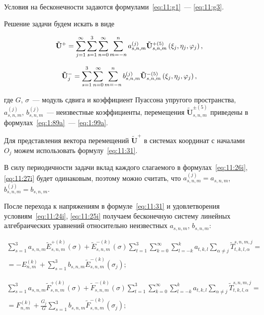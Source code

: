 \noindent Условия на бесконечности задаются формулами~\eqref{eq:11:g1}~--- \eqref{eq:11:g3}.

Решение задачи будем искать в виде

\begin{equation}
{\bf{\tilde U^+}} = \sum\limits_{j = 1}^\infty {\sum\limits_{s = 1}^3 {\sum\limits_{n = 0}^\infty  {\sum\limits_{m=-n}^{n} {a_{s,n,m}^{(j)}} } } } {\bf{\tilde U}}_{s,n,m}^{ + (5)}\left( {{\xi_j},{\eta _j},{\varphi _j}} \right),
\label{eq:11:26i}
\end{equation}

\begin{equation}
\mathbf{\tilde U}_j^- = {\sum\limits_{s = 1}^3 {\sum\limits_{n = 0}^\infty  {\sum\limits_{m=-n}^{n} {b_{s,n,m}^{(j)}} } } } {\bf{\tilde U}}_{s,n,m}^{ - (5)}\left( {{\xi_j},{\eta _j},{\varphi _j}} \right),
\label{eq:11:27i}
\end{equation}

\noindent где $G$, $\sigma$~--- модуль сдвига и коэффициент Пуассона упругого пространства, $a_{s,n,m}^{(j)}$, $b_{s,n,m}^{(j)}$~--- неизвестные коэффициенты, перемещения $\mathbf{\tilde U}_{s,n,m}^{\pm(5)}$ приведены в формулах~\eqref{eq:1:89a}~--- \eqref{eq:1:99a}.

Для представления вектора перемещений $\mathbf{\tilde U}^+$ в системах координат с началами $O_j$ можем использовать формулу~\eqref{eq:11:31}.

В силу периодичности задачи вклад каждого слагаемого в формулах~\eqref{eq:11:26i}, \eqref{eq:11:27i} будет одинаковым, поэтому можно считать, что $a_{s,n,m}^{(j)}=a_{s,n,m}$, $b_{s,n,m}^{(j)}=b_{s,n,m}$.

После перехода к напряжениям в формуле~\eqref{eq:11:31} и удовлетворения условиям~\eqref{eq:11:24i}, \eqref{eq:11:25i} получаем бесконечную систему линейных алгебраических уравнений относительно неизвестных $a_{s,n,m}$, $b_{s,n,m}$:

\begin{multline}
\sum\limits_{s=1}^3 a_{s,n,m}\tilde E_{s,n,m}^{+(k)}(\sigma)+\tilde E_{s,n,m}^{-(k)}(\sigma)\sum\limits_{t=1}^3\sum\limits_{k=0}^\infty\sum\limits_{l=-k}^k a_{t,k,l}\sum\limits_{\alpha\neq j}\tilde T_{t,k,l,\alpha}^{s,n,m,j}= \\
=-E_{n,m}^{(k)}+\sum\limits_{s=1}^3 b_{s,n,m}\tilde E_{s,n,m}^{-(k)}(\sigma_j);
\label{eq:11:28i}
\end{multline}

\begin{multline}
\sum\limits_{s=1}^3 a_{s,n,m}\tilde F_{s,n,m}^{+(k)}(\sigma)+\tilde F_{s,n,m}^{-(k)}(\sigma)\sum\limits_{t=1}^3\sum\limits_{k=0}^\infty\sum\limits_{l=-k}^k a_{t,k,l}\sum\limits_{\alpha\neq j}\tilde T_{t,k,l,\alpha}^{s,n,m,j}= \\
=F_{n,m}^{(k)}+\frac{G_j}{G}\sum\limits_{s=1}^3 b_{s,n,m}\tilde F_{s,n,m}^{-(k)}(\sigma_j);
\label{eq:11:29i}
\end{multline}

